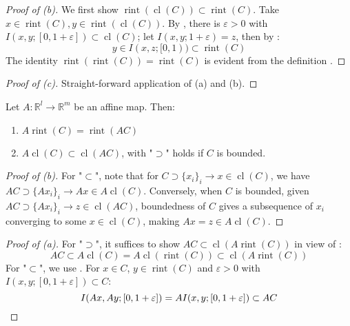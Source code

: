 \begin{proof}[Proof of (b)]
	We first show $\operatorname{rint}(\operatorname{cl}(C))\subset \operatorname{rint}(C)$. Take $x\in \operatorname{rint}(C),y\in \operatorname{rint}(\operatorname{cl}(C))$. By , there is $\varepsilon>0$ with $I(x,y;[0,1+\varepsilon ])\subset \operatorname{cl}(C)$; let $I(x,y;1+\varepsilon)=z$, then by :
	\[
		y\in I(x,z;[0, 1))\subset \operatorname{rint}(C)
	\]
	The identity $\operatorname{rint}(\operatorname{rint}(C))=\operatorname{rint}(C)$ is evident from the definition .
\end{proof}

\begin{proof}[Proof of (c)]Straight-forward application of (a) and (b).
\end{proof}

\begin{prop}
	\label{prop:012-image-rules}
	Let $A:\mathbb{R}^l\to \mathbb{R}^m$ be an affine map. Then:
	\begin{enumerate}[label=(\alph*)]
		\item $A\operatorname{rint}(C)=\operatorname{rint}(AC)$
		\item $A\operatorname{cl}(C)\subset \operatorname{cl}(AC)$, with "$\supset$" holds if $C$ is bounded.
	\end{enumerate}
\end{prop}

\begin{proof}[Proof of (b)]
	For "$\subset$", note that for $C\supset \{x_i\}_i\to x\in \operatorname{cl}(C)$, we have $AC\supset \{Ax_i\}_{i}\to Ax\in A\operatorname{cl}(C)$. Conversely, when $C$ is bounded, given $AC\supset \{Ax_i\}_i\to z\in \operatorname{cl}(AC)$, boundedness of $C$ gives a subsequence of $x_i$ converging to some $x\in \operatorname{cl}(C)$, making $Ax=z\in A\operatorname{cl}(C)$.
\end{proof}

\begin{proof}[Proof of (a)]
	For "$\supset$", it suffices to show $AC\subset \operatorname{cl}(A \operatorname{rint}(C))$ in view of :
	\[
		AC\subset A \operatorname{cl}(C) = A\operatorname{cl}(\operatorname{rint}(C)) \subset \operatorname{cl}(A \operatorname{rint}(C))
	\]
	For "$\subset$", we use . For $x\in C$, $y\in \operatorname{rint}(C)$ and $\varepsilon >0$ with $I(x,y;[0,1+\varepsilon ])\subset C$:
	\[
		I(Ax,Ay;[0,1+\varepsilon ])=AI(x,y;[0,1+\varepsilon ])\subset AC\qedhere
	\]
\end{proof}


